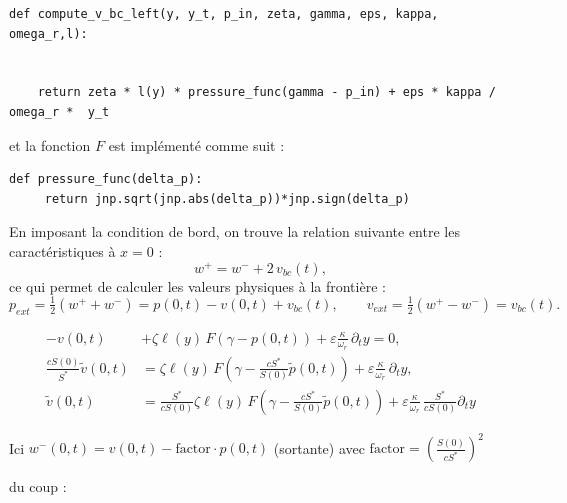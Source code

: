 \documentclass[12pt,a4paper]{article}
\begin{document}
\begin{verbatim}
def compute_v_bc_left(y, y_t, p_in, zeta, gamma, eps, kappa, omega_r,l):
    

    return zeta * l(y) * pressure_func(gamma - p_in) + eps * kappa / omega_r *  y_t
\end{verbatim}

et la fonction $F$ est implémenté comme suit :
\begin{verbatim}
def pressure_func(delta_p):
     return jnp.sqrt(jnp.abs(delta_p))*jnp.sign(delta_p)
\end{verbatim}

En imposant la condition de bord, on trouve la relation suivante entre les caractéristiques à $x=0$ :
\begin{equation}
    w^+ = w^- + 2\,v_{bc}(t),
\end{equation}
ce qui permet de calculer les valeurs physiques à la frontière :
\begin{equation}
    p_{ext} = \tfrac{1}{2}(w^+ + w^-) = p(0,t) - v(0,t) + v_{bc}(t),
    \qquad
    v_{ext} = \tfrac{1}{2}(w^+ - w^-) = v_{bc}(t).
\end{equation}

\begin{equation}
    \begin{align}
        -v(0,t) & + \zeta \ell(y)\,F(\gamma - p(0,t)) + \varepsilon\frac{\kappa}{\omega_r}\,\partial_t y = 0, \\
        \frac{cS(0)}{S^\ast}\tilde{v}(0,t) &= \zeta \ell(y)\,F(\gamma - \frac{cS^\ast}{S(0)}\tilde{p}(0,t)) + \varepsilon\frac{\kappa}{\omega_r}\,\partial_t y, \\
        \tilde{v}(0,t) &= \frac{S^\ast}{c S(0)} \zeta \ell(y)\,F(\gamma - \frac{cS^\ast}{S(0)}\tilde{p}(0,t)) + \varepsilon\frac{\kappa}{\omega_r}\,\frac{S^\ast}{c S(0)}\partial_t y 
    \end{align}
\end{equation}

Ici $w^-(0,t) = v(0,t) - \text{factor} \cdot p(0,t)$ (sortante) avec $ \text{factor} = \left(\frac{S(0)}{c S^\ast}\right)^2 $ 

du coup :
\end{document}

